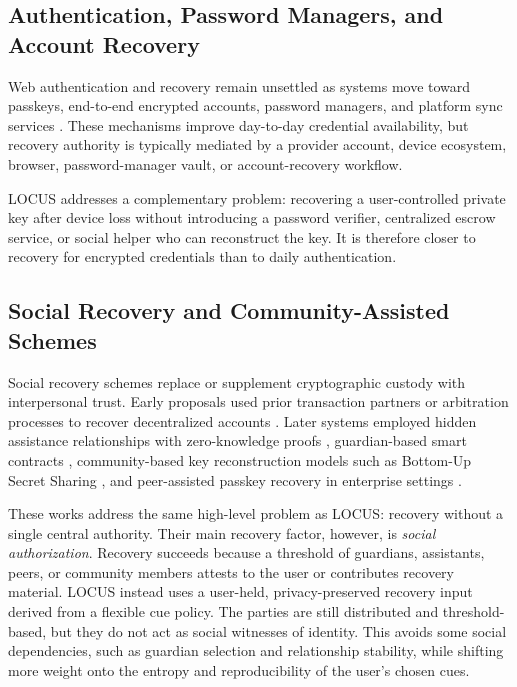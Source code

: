 \subsection{Authentication, Password Managers, and Account Recovery}

Web authentication and recovery remain unsettled as systems move toward passkeys, end-to-end encrypted accounts, password managers, and platform sync services \cite{Blessing2025WebAuthRecovery,Barbosa2025FIDO2,Li2014PasswordManagers,Pearman2019PasswordManagers,FIDOAlliancePasskeys,AppleKeychainSecurity}. These mechanisms improve day-to-day credential availability, but recovery authority is typically mediated by a provider account, device ecosystem, browser, password-manager vault, or account-recovery workflow.

\textsf{LOCUS} addresses a complementary problem: recovering a user-controlled private key after device loss without introducing a password verifier, centralized escrow service, or social helper who can reconstruct the key. It is therefore closer to recovery for encrypted credentials than to daily authentication.

\subsection{Social Recovery and Community-Assisted Schemes}

Social recovery schemes replace or supplement cryptographic custody with interpersonal trust. Early proposals used prior transaction partners or arbitration processes to recover decentralized accounts \cite{DAppRecovery2019}. Later systems employed hidden assistance relationships with zero-knowledge proofs \cite{CRSA2021}, guardian-based smart contracts \cite{SocialWallet2023}, community-based key reconstruction models such as Bottom-Up Secret Sharing \cite{ANARKey2025}, and peer-assisted passkey recovery in enterprise settings \cite{PeerRecovery2025}.

These works address the same high-level problem as \textsf{LOCUS}: recovery without a single central authority. Their main recovery factor, however, is \emph{social authorization}. Recovery succeeds because a threshold of guardians, assistants, peers, or community members attests to the user or contributes recovery material. \textsf{LOCUS} instead uses a user-held, privacy-preserved recovery input derived from a flexible cue policy. The parties are still distributed and threshold-based, but they do not act as social witnesses of identity. This avoids some social dependencies, such as guardian selection and relationship stability, while shifting more weight onto the entropy and reproducibility of the user's chosen cues.

